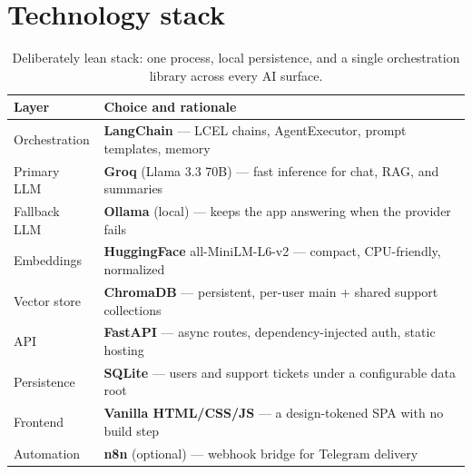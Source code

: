 \documentclass[11pt]{article}
\newcommand{\code}[1]{{\ttfamily\small #1}}
\begin{document}
\section{Technology stack}
\label{sec:stack}

\begin{table}[H]
\small
\setlength{\tabcolsep}{7pt}\renewcommand{\arraystretch}{1.25}
\begin{tabularx}{\linewidth}{@{}l L@{}}
\toprule
\sffamily\bfseries Layer & \sffamily\bfseries Choice and rationale \\
\midrule
Orchestration & \textbf{LangChain} --- LCEL chains, \code{AgentExecutor}, prompt templates, memory \\
Primary LLM   & \textbf{Groq} (Llama 3.3 70B) --- fast inference for chat, RAG, and summaries \\
Fallback LLM  & \textbf{Ollama} (local) --- keeps the app answering when the provider fails \\
Embeddings    & \textbf{HuggingFace} \code{all-MiniLM-L6-v2} --- compact, CPU-friendly, normalized \\
Vector store  & \textbf{ChromaDB} --- persistent, per-user main + shared support collections \\
API           & \textbf{FastAPI} --- async routes, dependency-injected auth, static hosting \\
Persistence   & \textbf{SQLite} --- users and support tickets under a configurable data root \\
Frontend      & \textbf{Vanilla HTML/CSS/JS} --- a design-tokened SPA with no build step \\
Automation    & \textbf{n8n} (optional) --- webhook bridge for Telegram delivery \\
\bottomrule
\end{tabularx}
\caption{Deliberately lean stack: one process, local persistence, and a single
orchestration library across every AI surface.}
\end{table}
\end{document}
